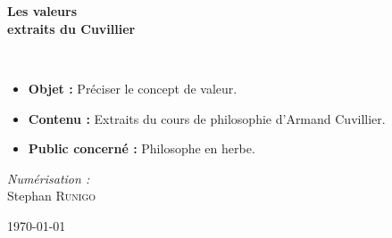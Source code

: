 \begin{titlepage}
%
~\\[1cm]

\begin{center}
\end{center}

\textsc{\Large }\\[0.5cm]

\HRule

\begin{center}
{\huge \bfseries  Les valeurs\\
\large extraits du Cuvillier\\[0.4cm] }
\end{center}

\HRule \\[1.5cm]

\begin{center}
\end{center}

\begin{center}
\end{center}

\begin{itemize}[leftmargin=1cm, label=, itemsep=1pt]
\item {\bf Objet : } Préciser le concept de valeur.
\item {\bf Contenu : } Extraits du cours de philosophie d'Armand Cuvillier.
\item {\bf Public concerné : } Philosophe en herbe.
\end{itemize}

\vfill

\begin{minipage}{0.4\textwidth}
\begin{flushleft}
\end{flushleft}
\end{minipage}
\begin{minipage}{0.4\textwidth}
\begin{flushright} \large
\emph{Numérisation :}\\
Stephan \textsc{Runigo}
\end{flushright}
\end{minipage}

\vfill

{\large \today}

\end{titlepage}
